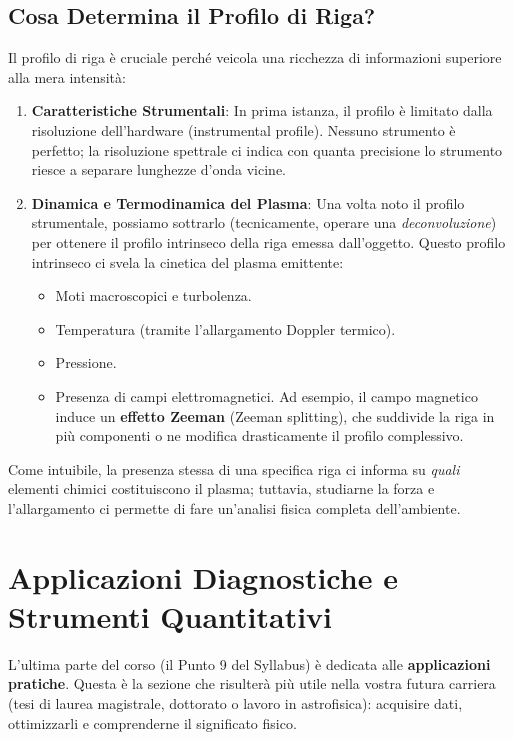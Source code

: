 \subsection{Cosa Determina il Profilo di Riga?}

Il profilo di riga è cruciale perché veicola una ricchezza di informazioni superiore alla mera intensità:
\begin{enumerate}
    \item \textbf{Caratteristiche Strumentali}: In prima istanza, il profilo è limitato dalla risoluzione dell'hardware (instrumental profile). Nessuno strumento è perfetto; la risoluzione spettrale ci indica con quanta precisione lo strumento riesce a separare lunghezze d'onda vicine.
    \item \textbf{Dinamica e Termodinamica del Plasma}: Una volta noto il profilo strumentale, possiamo sottrarlo (tecnicamente, operare una \textit{deconvoluzione}) per ottenere il profilo intrinseco della riga emessa dall'oggetto. Questo profilo intrinseco ci svela la cinetica del plasma emittente:
    \begin{itemize}
        \item Moti macroscopici e turbolenza.
        \item Temperatura (tramite l'allargamento Doppler termico).
        \item Pressione.
        \item Presenza di campi elettromagnetici. Ad esempio, il campo magnetico induce un \textbf{effetto Zeeman} (Zeeman splitting), che suddivide la riga in più componenti o ne modifica drasticamente il profilo complessivo.
    \end{itemize}
\end{enumerate}

Come intuibile, la presenza stessa di una specifica riga ci informa su \textit{quali} elementi chimici costituiscono il plasma; tuttavia, studiarne la forza e l'allargamento ci permette di fare un'analisi fisica completa dell'ambiente.

\section{Applicazioni Diagnostiche e Strumenti Quantitativi}

L'ultima parte del corso (il Punto 9 del Syllabus) è dedicata alle \textbf{applicazioni pratiche}. Questa è la sezione che risulterà più utile nella vostra futura carriera (tesi di laurea magistrale, dottorato o lavoro in astrofisica): acquisire dati, ottimizzarli e comprenderne il significato fisico.

